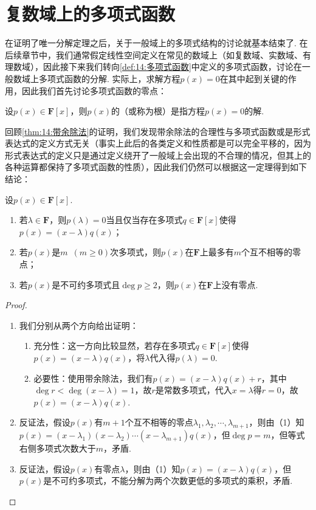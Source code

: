 \section{复数域上的多项式函数}
在证明了唯一分解定理之后，关于一般域上的多项式结构的讨论就基本结束了. 在后续章节中，我们通常假定线性空间定义在常见的数域上（如复数域、实数域、有理数域），因此接下来我们转向\autoref{def:14:多项式函数}中定义的多项式函数，讨论在一般数域上多项式函数的分解. 实际上，求解方程$p(x)=0$在其中起到关键的作用，因此我们首先讨论多项式函数的零点：
\begin{definition}
    设$p(x)\in\mathbf{F}[x]$，则$p(x)$的（或称为根）是指方程$p(x)=0$的解.
\end{definition}

回顾\autoref{thm:14:带余除法}的证明，我们发现带余除法的合理性与多项式函数或是形式表达式的定义方式无关（事实上此后的各类定义和性质都是可以完全平移的，因为形式表达式的定义只是通过定义绕开了一般域上会出现的不合理的情况，但其上的各种运算都保持了多项式函数的性质），因此我们仍然可以根据这一定理得到如下结论：
\begin{theorem} \label{thm:14:多项式函数根的性质}
    设$p(x)\in\mathbf{F}[x]$.
    \begin{enumerate}
        \item 若$\lambda\in\mathbf{F}$，则$p(\lambda)=0$当且仅当存在多项式$q\in\mathbf{F}[x]$使得$p(x)=(x-\lambda)q(x)$；
        \item 若$p(x)$是$m\enspace(m \geqslant 0)$次多项式，则$p(x)$在$\mathbf{F}$上最多有$m$个互不相等的零点；
        \item 若$p(x)$是不可约多项式且$\deg p\geqslant 2$，则$p(x)$在$\mathbf{F}$上没有零点.
    \end{enumerate}
\end{theorem}
\begin{proof}
    \begin{enumerate}
        \item 我们分别从两个方向给出证明：
        \begin{enumerate}
            \item 充分性：这一方向比较显然，若存在多项式$q\in\mathbf{F}[x]$使得$p(x)=(x-\lambda)q(x)$，将$\lambda$代入得$p(\lambda)=0$.
            \item 必要性：使用带余除法，我们有$p(x)=(x-\lambda)q(x)+r$，其中$\deg r<\deg(x-\lambda)=1$，故$r$是常数多项式，代入$x=\lambda$得$r=0$，故$p(x)=(x-\lambda)q(x)$.
        \end{enumerate}
        \item 反证法，假设$p(x)$有$m+1$个互不相等的零点$\lambda_1,\lambda_2,\cdots,\lambda_{m+1}$，则由（1）知$p(x)=(x-\lambda_1)(x-\lambda_2)\cdots(x-\lambda_{m+1})q(x)$，但$\deg p=m$，但等式右侧多项式次数大于$m$，矛盾.
        \item 反证法，假设$p(x)$有零点$\lambda$，则由（1）知$p(x)=(x-\lambda)q(x)$，但$p(x)$是不可约多项式，不能分解为两个次数更低的多项式的乘积，矛盾.
    \end{enumerate}
\end{proof}

